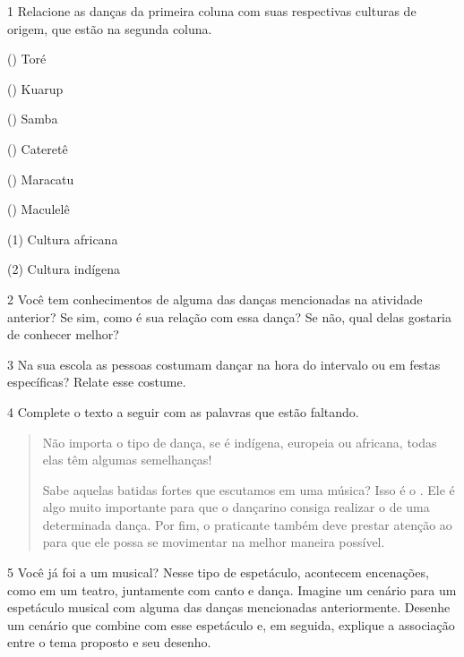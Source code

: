 
\num{1} Relacione as danças da primeira coluna com suas respectivas culturas de
  origem, que estão na segunda coluna.

\begin{multicols}{2}
() Toré

() Kuarup

() Samba

() Cateretê

() Maracatu

() Maculelê

\columnbreak

(1) Cultura africana\medskip

(2) Cultura indígena
\end{multicols}


\num{2} Você tem conhecimentos de alguma das danças mencionadas na atividade anterior? Se sim, como é sua relação com essa dança? Se não, qual delas gostaria de conhecer melhor?


\num{3} Na sua escola as pessoas costumam dançar na hora do intervalo ou em festas específicas? Relate esse costume.


\num{4} Complete o texto a seguir com as palavras que estão faltando.

\begin{quote}
Não importa o tipo de dança, se é indígena, europeia ou africana, todas
elas têm algumas semelhanças!

Sabe aquelas batidas fortes que escutamos em uma música? Isso é o .
Ele é algo muito importante para que o dançarino consiga realizar o  de
uma determinada dança. Por fim, o praticante também deve prestar atenção ao
 para que ele possa se movimentar na melhor maneira possível.
\end{quote}


\num{5} Você já foi a um musical? Nesse tipo de espetáculo, acontecem encenações, como em um teatro, juntamente com canto e dança. Imagine um cenário para um espetáculo musical com alguma das danças mencionadas anteriormente. Desenhe um cenário que combine com esse espetáculo e, em seguida, explique a associação entre o tema proposto e seu desenho.

